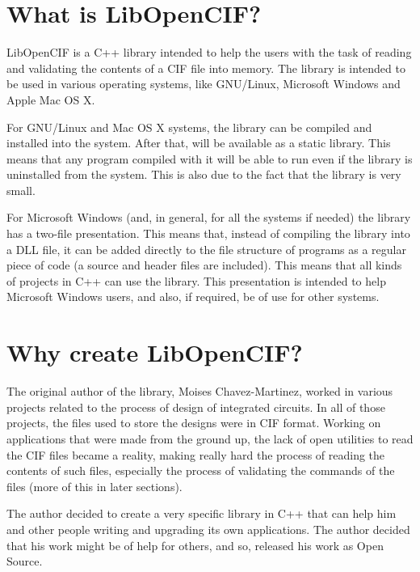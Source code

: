 \documentclass[11pt,twoside,openany,x11names,svgnames]{memoir}
\begin{document}
\section{What is LibOpenCIF?}\label{What-is-LibOpenCIF}

LibOpenCIF is a C++ library intended to help the users with the task of reading and validating the contents of a CIF file into memory. The library is intended to be used in various operating systems, like GNU/Linux, Microsoft Windows and Apple Mac OS X.

For GNU/Linux and Mac OS X systems, the library can be compiled and installed into the system. After that, will be available as a static library. This means that any program compiled with it will be able to run even if the library is uninstalled from the system. This is also due to the fact that the library is very small.

For Microsoft Windows (and, in general, for all the systems if needed) the library has a two-file presentation. This means that, instead of compiling the library into a DLL file, it can be added directly to the file structure of programs as a regular piece of code (a source and header files are included). This means that all kinds of projects in C++ can use the library. This presentation is intended to help Microsoft Windows users, and also, if required, be of use for other systems.

\section{Why create LibOpenCIF?}\label{Why-create-LibOpenCIF}

The original author of the library, Moises Chavez-Martinez, worked in various projects related to the process of design of integrated circuits. In all of those projects, the files used to store the designs were in CIF format. Working on applications that were made from the ground up, the lack of open utilities to read the CIF files became a reality, making really hard the process of reading the contents of such files, especially the process of validating the commands of the files (more of this in later sections).

The author decided to create a very specific library in C++ that can help him and other people writing and upgrading its own applications. The author decided that his work might be of help for others, and so, released his work as Open Source.
\end{document}
